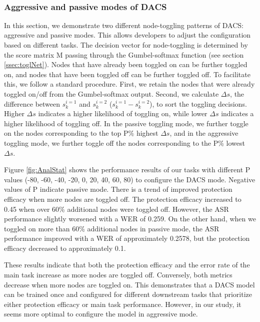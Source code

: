 \
\subsubsection{Aggressive and passive modes of DACS}

In this section, we demonstrate two different node-toggling patterns of DACS: aggressive and passive modes. This allows developers to adjust the configuration based on different tasks. The decision vector for node-toggling is determined by the score matrix M passing through the Gumbel-softmax function (see section \ref{ssec:toglNet}). Nodes that have already been toggled on can be further toggled on, and nodes that have been toggled off can be further toggled off. To facilitate this, we follow a standard procedure. First, we retain the nodes that were already toggled on/off from the Gumbel-softmax output. Second, we calculate $\Delta s$, the difference between $s^{i=1}_{k}$ and $s^{i=2}_{k}$ ($s^{i=1}_{k} - s^{i=2}_{k}$), to sort the toggling decisions. Higher $\Delta s$ indicates a higher likelihood of toggling on, while lower $\Delta s$ indicates a higher likelihood of toggling off. In the passive toggling mode, we further toggle on the nodes corresponding to the top P\% highest $\Delta s$, and in the aggressive toggling mode, we further toggle off the nodes corresponding to the P\% lowest $\Delta s$.

Figure \ref{fig:AnalStat} shows the performance results of our tasks with different P values (-80, -60, -40, -20, 0, 20, 40, 60, 80) to configure the DACS mode. Negative values of P indicate passive mode. There is a trend of improved protection efficacy when more nodes are toggled off. The protection efficacy increased to 0.45 when over 60\% additional nodes were toggled off. However, the ASR performance slightly worsened with a WER of 0.259. On the other hand, when we toggled on more than 60\% additional nodes in passive mode, the ASR performance improved with a WER of approximately 0.2578, but the protection efficacy decreased to approximately 0.1.

These results indicate that both the protection efficacy and the error rate of the main task increase as more nodes are toggled off. Conversely, both metrics decrease when more nodes are toggled on. This demonstrates that a DACS model can be trained once and configured for different downstream tasks that prioritize either protection efficacy or main task performance. However, in our study, it seems more optimal to configure the model in aggressive mode.

